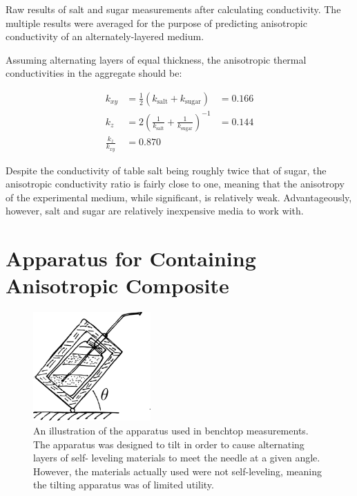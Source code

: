 \begin{table}[h]
\centering

\caption{Raw results of salt and sugar measurements after calculating conductivity. The multiple results were averaged for the purpose of predicting anisotropic conductivity of an alternately-layered medium.}
\label{tab:saltnsugar}
\end{table}

Assuming alternating layers of equal thickness, the anisotropic thermal
conductivities in the aggregate should be:

\begin{align}
k_{xy} &= \frac12 \left( k_{\textrm{salt}} + k_{\textrm{sugar}} \right) &= \boxed{0.166}\\
k_z &= 2 \left( \frac1{k_{\textrm{salt}}} + \frac1{k_{\textrm{sugar}}} \right)^{-1} &= \boxed{0.144}\\
\frac{k_z}{k_{xy}} &= \boxed{0.870}
\end{align}

Despite the conductivity of table salt being roughly twice that of sugar, the
anisotropic conductivity ratio is fairly close to one, meaning that the anisotropy
of the experimental medium, while significant, is relatively weak. Advantageously, however, salt and sugar are relatively inexpensive media to work with.

\section{Apparatus for Containing Anisotropic Composite}

\begin{figure}[h]
\centering
\includegraphics[width=0.4\textwidth]{fig/tilter_diagram.png}
\caption{An illustration of the apparatus used in benchtop measurements. The
apparatus was designed to tilt in order to cause alternating layers of self-
leveling materials to meet the needle at a given angle. However, the materials
actually used were not self-leveling, meaning the tilting apparatus was of 
limited utility.}
\label{fig:tilter_diagram}
\end{figure}

